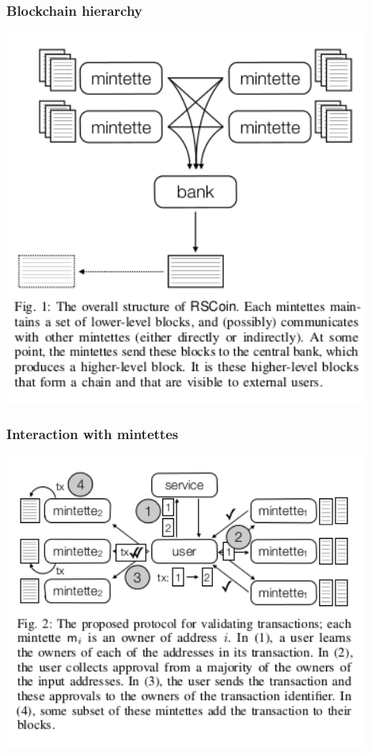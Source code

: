\documentclass{beamer}
\begin{document}
\begin{frame}[fragile]
\frametitle{Blockchain hierarchy}
\includegraphics[width=0.9\textwidth]{rscoin_diagram_1.png}
\end{frame}

\begin{frame}[fragile]
\frametitle{Interaction with mintettes}
\includegraphics[width=0.9\textwidth]{rscoin_diagram_2.png}
\end{frame}
\end{document}
